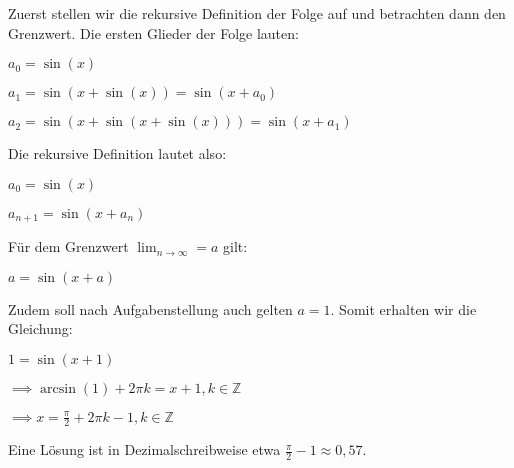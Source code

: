 \item Zuerst stellen wir die rekursive Definition der Folge auf und betrachten dann den Grenzwert. Die ersten Glieder der Folge lauten:

$a_0 = \sin(x)$

$a_1 = \sin(x+\sin(x)) = \sin(x+a_0)$

$a_2 = \sin(x+\sin(x+\sin(x))) = \sin(x+a_1)$

Die rekursive Definition lautet also:

$a_0 = \sin(x)$

$a_{n+1} = \sin(x+a_n)$

Für dem Grenzwert $\lim_{n\to\infty} = a$ gilt:

$a = \sin(x+a)$

Zudem soll nach Aufgabenstellung auch gelten $a = 1$. Somit erhalten wir die Gleichung:

$1 = \sin(x+1)$

$\implies \arcsin(1) + 2\pi k = x + 1, k \in \mathbb{Z}$

$\implies x = \frac{\pi}{2} + 2\pi k - 1, k \in \mathbb{Z}$

Eine Lösung ist in Dezimalschreibweise etwa $\frac{\pi}{2}-1 \approx 0,57$.

